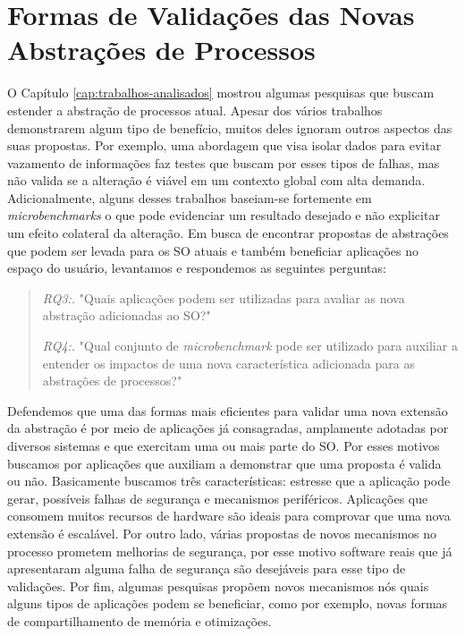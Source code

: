\chapter{Formas de Validações das Novas Abstrações de Processos}
\label{cap:validacoes}

O Capítulo \ref{cap:trabalhos-analisados} mostrou algumas pesquisas que buscam
estender a abstração de processos atual. Apesar dos vários trabalhos
demonstrarem algum tipo de benefício, muitos deles ignoram outros aspectos das
suas propostas. Por exemplo, uma abordagem que visa isolar dados para evitar
vazamento de informações faz testes que buscam por esses tipos de falhas, mas
não valida se a alteração é viável em um contexto global com alta demanda.
Adicionalmente, alguns desses trabalhos baseiam-se fortemente em
\textit{microbenchmarks} o que pode evidenciar um resultado desejado e não
explicitar um efeito colateral da alteração. Em busca de encontrar propostas de
abstrações que podem ser levada para os SO atuais e também beneficiar
aplicações no espaço do usuário, levantamos e respondemos as seguintes
perguntas:

\begin{quote}
 \item \textit{RQ3:.} "Quais aplicações podem ser utilizadas para avaliar as nova abstração adicionadas ao SO?"
 \item \textit{RQ4:.} "Qual conjunto de \emph{microbenchmark} pode ser utilizado para auxiliar a entender os impactos de uma nova característica adicionada para as abstrações de processos?"
\end{quote}

Defendemos que uma das formas mais eficientes para validar uma nova extensão da
abstração é por meio de aplicações já consagradas, amplamente adotadas por
diversos sistemas e que exercitam uma ou mais parte do SO. Por esses motivos
buscamos por aplicações que auxiliam a demonstrar que uma proposta é
valida ou não. Basicamente buscamos três características: estresse que a
aplicação pode gerar, possíveis falhas de segurança e mecanismos periféricos.
Aplicações que consomem muitos recursos de hardware são ideais para comprovar
que uma nova extensão é escalável. Por outro lado, várias propostas de novos
mecanismos no processo prometem melhorias de segurança, por esse motivo
software reais que já apresentaram alguma falha de segurança são desejáveis
para esse tipo de validações. Por fim, algumas pesquisas propõem novos
mecanismos nós quais alguns tipos de aplicações podem se beneficiar, como por
exemplo, novas formas de compartilhamento de memória e otimizações.

